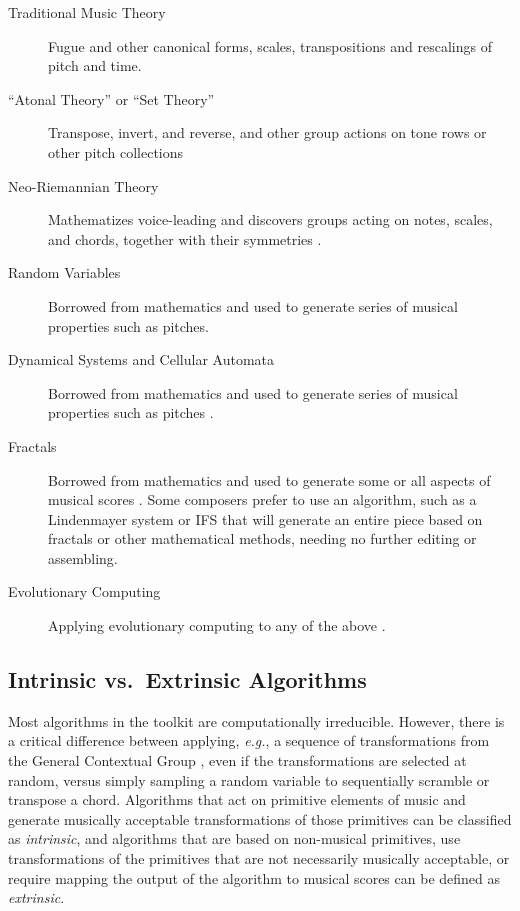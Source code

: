 \documentclass[]{interact}
\theoremstyle{plain}%
\theoremstyle{definition}
\theoremstyle{remark}
\begin{document}
\begin{description}
\item[Traditional Music Theory] Fugue and other canonical forms, scales, transpositions and rescalings of pitch and time.
\item[``Atonal Theory'' or ``Set Theory''] Transpose, invert, and reverse, and other group actions on tone rows or other pitch collections \citep{rahn1991basic}
\item[Neo-Riemannian Theory] Mathematizes voice-leading and discovers groups acting on notes, scales, and chords, together with their symmetries \citep{tymoczko2006geometry, tymoczko2011geometry, generalizedvoiceleadingspaces}.
\item[Random Variables] Borrowed from mathematics and used to generate series of musical properties such as pitches.
\item[Dynamical Systems and Cellular Automata] Borrowed from mathematics and used to generate series of musical properties such as pitches \citep{Miranda1993}.
\item[Fractals] Borrowed from mathematics and used to generate some or all aspects of musical scores \citep{miranda2001composing, madden2007fractals}. Some composers prefer to use an algorithm, such as a Lindenmayer system \citep{algorithmicbeautyofplants, prusinkiewicz1986sgs,  fractalmusicwithstringrewritinggrammars} or IFS \citep{barnsley1993, ifsmusic} that will generate an entire piece based on fractals or other mathematical methods, needing no further editing or assembling. 
\item[Evolutionary Computing] Applying evolutionary computing to any of the above \citep{miranda2007evolutionary}.
\end{description}

\subsection{Intrinsic vs.\ Extrinsic Algorithms}

Most algorithms in the toolkit are computationally irreducible. However, there is a critical difference between applying, \emph{e.g.}, a sequence of transformations from the General Contextual Group \citep{fiore2005gcg}, even if the transformations are selected at random, versus simply sampling a random variable to sequentially scramble or transpose a chord. Algorithms that act on primitive elements of music and generate musically acceptable transformations of those primitives can be classified as \emph{intrinsic}, and algorithms that are based on non-musical primitives, use transformations of the primitives that are not necessarily musically acceptable, or require mapping the output of the algorithm to musical scores can be defined as \emph{extrinsic}. 
\end{document}
